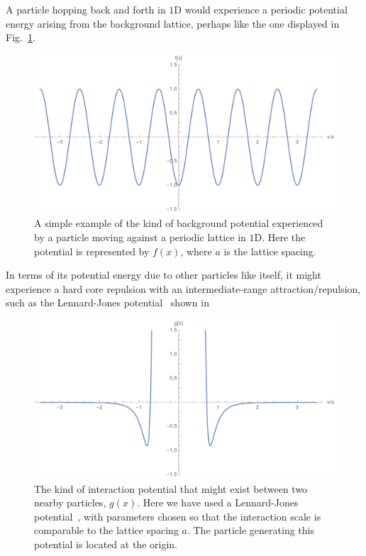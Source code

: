 A particle hopping back and forth in $1$D would experience a periodic potential energy arising from the 
background lattice, perhaps like the one displayed in Fig.~\ref{fig:periodicPot}.
\begin{figure} \caption[An impression of the kind of background potential experienced by a particle moving
against a periodic lattice in $1$D.]{A simple example of the kind of background potential experienced by a 
particle moving against a periodic lattice in $1$D. Here the potential is represented by $f(x)$, where $a$
is the lattice spacing.} 
\label{fig:periodicPot}
\begin{center}
\includegraphics[width=1.0\textwidth]{intro/images/fPlot}
\end{center}
\end{figure}
In terms of its potential
energy due to other particles like itself, it might experience a hard core repulsion with an 
intermediate-range attraction/repulsion, such as the Lennard-Jones 
potential~\cite{atkins2011} shown in 
\begin{figure} \caption[The kind of interaction potential that might exist between two nearby particles.]{The kind of interaction potential that might exist between two nearby particles, $g(x)$. Here we have 
used a Lennard-Jones potential~\cite{atkins2011}, with parameters chosen so that the interaction scale is comparable to the
lattice spacing $a$. The particle generating this potential is located at the origin.} 
\label{fig:partInteraction}
\begin{center}
\includegraphics[width=1.0\textwidth]{intro/images/gPlot}
\end{center}
\end{figure}
